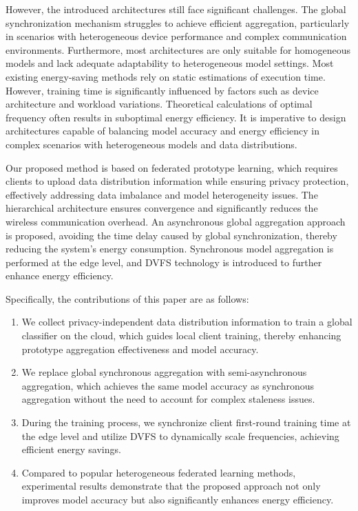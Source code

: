 \documentclass[journal]{IEEEtran}
\begin{document}
However, the introduced architectures still face significant challenges. The global synchronization mechanism struggles to achieve efficient aggregation, particularly in scenarios with heterogeneous device performance and complex communication environments. Furthermore, most architectures \cite{luo2024communication_CEC,wu2023hiflash_CEC} are only suitable for homogeneous models and lack adequate adaptability to heterogeneous model settings. Most existing energy-saving methods rely on static estimations of execution time. However, training time is significantly influenced by factors such as device architecture and workload variations. Theoretical calculations of optimal frequency often results in suboptimal energy efficiency. It is imperative to design architectures capable of balancing model accuracy and energy efficiency in complex scenarios with heterogeneous models and data distributions.

Our proposed method is based on federated prototype learning, which requires clients to upload data distribution information while ensuring privacy protection, effectively addressing data imbalance and model heterogeneity issues. The hierarchical architecture ensures convergence \cite{liu_hierarchical_2023} and significantly reduces the wireless communication overhead. An asynchronous global aggregation approach is proposed, avoiding the time delay caused by global synchronization, thereby reducing the system's energy consumption. Synchronous model aggregation is performed at the edge level, and DVFS technology is introduced to further enhance energy efficiency. 

Specifically, the contributions of this paper are as follows:
\begin{enumerate}
    \item We collect privacy-independent data distribution information to train a global classifier on the cloud, which guides local client training, thereby enhancing prototype aggregation effectiveness and model accuracy.  
    \item We replace global synchronous aggregation with semi-asynchronous aggregation, which achieves the same model accuracy as synchronous aggregation without the need to account for complex staleness issues.  
    \item During the training process, we synchronize client first-round training time at the edge level and utilize DVFS to dynamically scale frequencies, achieving efficient energy savings.  
    \item Compared to popular heterogeneous federated learning methods, experimental results demonstrate that the proposed approach not only improves model accuracy but also significantly enhances energy efficiency.
\end{enumerate} 
\end{document}
